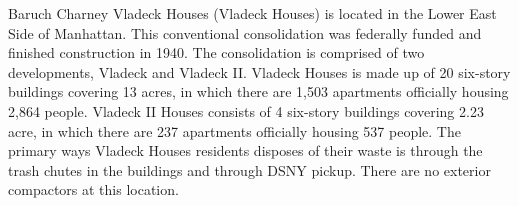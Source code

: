 

Baruch Charney Vladeck Houses (Vladeck Houses) is located in the Lower East Side of Manhattan. This conventional consolidation was federally funded and finished construction in 1940. The consolidation is comprised of two developments, Vladeck and Vladeck II. Vladeck Houses is made up of 20 six-story buildings covering 13 acres, in which there are 1,503 apartments officially housing 2,864 people. Vladeck II Houses consists of 4 six-story buildings covering 2.23 acre, in which there are 237 apartments officially housing 537 people. The primary ways Vladeck Houses residents disposes of their waste is through the trash chutes in the buildings and through DSNY pickup. There are no exterior compactors at this location. 